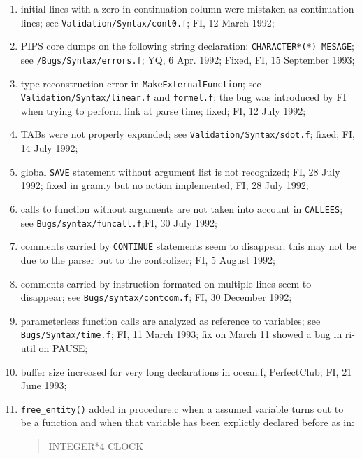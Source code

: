 \begin{enumerate}
  \item initial lines with a zero in continuation column were mistaken
        as continuation lines; see \verb+Validation/Syntax/cont0.f+;
        FI, 12 March 1992;

  \item PIPS core dumps on the following string declaration:
        \verb+CHARACTER*(*) MESAGE+; see \verb+/Bugs/Syntax/errors.f+; YQ,
        6 Apr. 1992; Fixed, FI, 15 September 1993;

  \item type reconstruction error in \verb+MakeExternalFunction+; see
        \verb+Validation/Syntax/linear.f+ and \verb+formel.f+; the bug
        was introduced by FI when trying to perform link at parse time;
        fixed; FI, 12 July 1992;

  \item TABs were not properly expanded; see \verb+Validation/Syntax/sdot.f+;
        fixed; FI, 14 July 1992;

  \item global \verb+SAVE+ statement without argument list is not recognized;
        FI, 28 July 1992; fixed in gram.y but no action implemented, FI,
        28 July 1992;

  \item calls to function without arguments are not taken into account
        in \verb+CALLEES+; see \verb+Bugs/syntax/funcall.f+;FI, 30 July 1992;

  \item comments carried by \verb+CONTINUE+ statements seem to disappear;
        this may not be due to the parser but to the controlizer;
        FI, 5 August 1992;

  \item comments carried by instruction formated on multiple lines seem
        to disappear; see \verb+Bugs/syntax/contcom.f+; FI, 30 December 1992;

  \item parameterless function calls are analyzed as reference to
        variables; see \verb+Bugs/Syntax/time.f+; FI, 11 March 1993;
        fix on March 11 showed a bug in ri-util on PAUSE;

  \item buffer size increased for very long declarations in ocean.f,
        PerfectClub; FI, 21 June 1993;

  \item {\tt free\_entity()} added in procedure.c when a assumed variable turns
        out to be a function and when that variable has been explictly 
        declared before as in:
\begin{quote}
INTEGER*4 CLOCK


\end{quote}
\end{enumerate}
